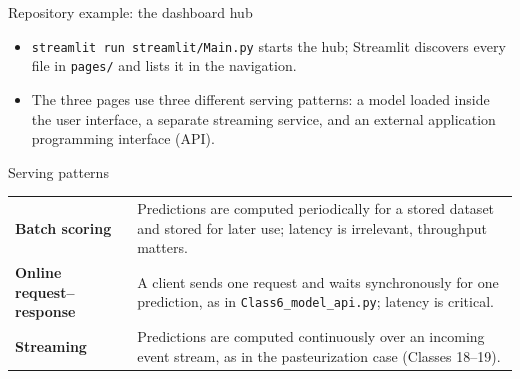 \begin{frame}{Repository example: the dashboard hub}
\centering
{}
\vspace{0.6em}
\begin{itemize}\footnotesize
\item \texttt{streamlit run streamlit/Main.py} starts the hub; Streamlit discovers every file in \texttt{pages/} and lists it in the navigation.
\item The three pages use three different serving patterns: a model loaded inside the user interface, a separate streaming service, and an external application programming interface (API).
\end{itemize}
\coursefooter
\end{frame}

\begin{frame}{Serving patterns}
\begin{tabularx}{\textwidth}{>{\bfseries}l X}
Batch scoring & Predictions are computed periodically for a stored dataset and stored for later use; latency is irrelevant, throughput matters. \\
\addlinespace[0.3em]
Online request--response & A client sends one request and waits synchronously for one prediction, as in \texttt{Class6\_model\_api.py}; latency is critical. \\
\addlinespace[0.3em]
Streaming & Predictions are computed continuously over an incoming event stream, as in the pasteurization case (Classes 18--19). \\
\bottomrule
\end{tabularx}
\coursefooter
\end{frame}

